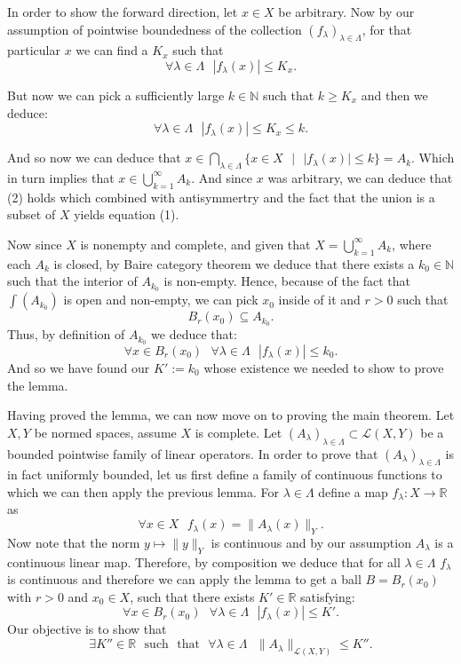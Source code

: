 \documentclass[11pt]{article}
\newcommand\st{\text{ } | \text{ }}
\newcommand\R{\mathbb{R}}
\newcommand\N{\mathbb{N}}
\newcommand\sucht{\sep \mathrm{such} \sep \mathrm{that} \sep}
\newcommand\sep{\text{ }}
\begin{document}
 In order to show the forward direction, let $x \in X$ be arbitrary. Now by our assumption
 of pointwise boundedness of the collection  $\left( f_\lambda \right)_{\lambda \in \Lambda} $,
for that particular $x$ we can find a  $K_x$ such that
$$\forall \lambda \in \Lambda \sep |f_\lambda\left( x \right)| \le K_x. $$

But now we can pick a sufficiently large $k \in \N$ such that  $k \ge K_x$ and then
we deduce:
\[
\forall \lambda \in \Lambda \sep |f_\lambda(x)| \le K_x \le k
.\]

And so now we can deduce that $x \in \bigcap_{\lambda \in \Lambda}\lbrace x \in X \st
|f_\lambda(x)| \le k \rbrace = A_k$. Which in turn implies that $x \in \bigcup_{k = 1}^\infty A_k$.
And since  $x$ was arbitrary, we can deduce that (2) holds which combined with
antisymmertry and the fact that the union is a subset of $X$ yields equation (1).

Now since $X$ is nonempty and complete, and given that  $X = \bigcup_{k = 1}^\infty A_k$, where
each  $A_k$ is closed, by Baire category theorem we deduce that there exists a
$k_0 \in \N$ such that the interior of  $A_{k_0}$ is non-empty.
Hence, because of the fact that $\int(A_{k_0})$ is open and non-empty, we can pick
$x_0$ inside of it and  $r > 0$ such that
 \[
   B_r(x_0) \subseteq A_{k_0}
.\]
Thus, by definition of $A_{k_0}$ we deduce that:
 \[
 \forall x \in B_r(x_0) \sep \forall \lambda \in \Lambda \sep |f_\lambda(x)| \le k_0
.\]
And so we have found our $K' := k_0$ whose existence we needed to show to prove
the lemma. \hfill \blacksquare

Having proved the lemma, we can now move on to proving the main theorem.
Let $X, Y$ be normed spaces, assume  $X$ is complete. Let
  $\left( A_\lambda \right)_{\lambda \in \Lambda} \subset \mathcal{L}\left( X, Y \right) $
  be a bounded pointwise family of linear operators. In order to prove that
  $\left( A_\lambda \right)_{\lambda \in \Lambda} $ is in fact uniformly bounded,
  let us first define a family of continuous functions to which we can then apply the
  previous lemma. For $\lambda \in \Lambda$ define a map  $f_\lambda : X \to \R$ as
   \[
   \forall x \in X \sep f_\lambda(x) = \|A_\lambda(x)\|_Y
  .\]
  Now note that the norm $y \mapsto \|y\|_Y$ is continuous and by our assumption
  $A_\lambda$ is a continuous linear map. Therefore, by composition we deduce that
  for all $\lambda \in \Lambda$  $f_\lambda $ is continuous and therefore we can
  apply the lemma to get a ball  $B = B_r(x_0)$ with  $r > 0$ and  $x_0 \in X$,
  such that  there exists $K' \in \R$ satisfying:
  \begin{equation}
 \forall x \in B_r(x_0) \sep \forall \lambda \in \Lambda \sep |f_\lambda(x)| \le K'
.\end{equation}
 Our objective is to show that
 \[
    \exists K'' \in \R \sucht \forall \lambda \in \Lambda \sep \|A_\lambda \|_{\mathcal{L}\left( X, Y \right) } \le K''
 .\]
\end{document}
